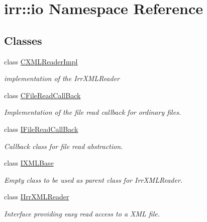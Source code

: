 \hypertarget{namespaceirr_1_1io}{
\section{irr::io Namespace Reference}
\label{namespaceirr_1_1io}
}
\subsection*{Classes}
\begin{CompactItemize}
\item 
class \hyperlink{classirr_1_1io_1_1_c_x_m_l_reader_impl}{CXMLReaderImpl}
\begin{CompactList}\small\item\em implementation of the IrrXMLReader \item\end{CompactList}\item 
class \hyperlink{classirr_1_1io_1_1_c_file_read_call_back}{CFileReadCallBack}
\begin{CompactList}\small\item\em Implementation of the file read callback for ordinary files. \item\end{CompactList}\item 
class \hyperlink{classirr_1_1io_1_1_i_file_read_call_back}{IFileReadCallBack}
\begin{CompactList}\small\item\em Callback class for file read abstraction. \item\end{CompactList}\item 
class \hyperlink{classirr_1_1io_1_1_i_x_m_l_base}{IXMLBase}
\begin{CompactList}\small\item\em Empty class to be used as parent class for IrrXMLReader. \item\end{CompactList}\item 
class \hyperlink{classirr_1_1io_1_1_i_irr_x_m_l_reader}{IIrrXMLReader}
\begin{CompactList}\small\item\em Interface providing easy read access to a XML file. \item\end{CompactList}\end{CompactItemize}
